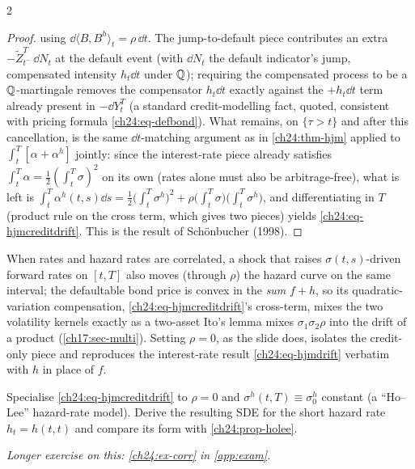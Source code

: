 \begin{paracol}{2}
\begin{proof}
using $\dd\langle B,B^h\rangle_t=\rho\,\dd t$. The jump-to-default piece contributes an extra $-\tilde Z_{t^-}^T\,\dd N_t$ at the default event (with $\dd N_t$ the default indicator's jump, compensated intensity $h_t\dd t$ under $\mathbb{Q}$); requiring the compensated process to be a $\mathbb{Q}$-martingale removes the compensator $h_t\dd t$ exactly against the $+h_t\dd t$ term already present in $-\dd Y_t^T$ (a standard credit-modelling fact, quoted, consistent with pricing formula \eqref{ch24:eq-defbond}). What remains, on $\{\tau>t\}$ and after this cancellation, is the same $\dd t$-matching argument as in \cref{ch24:thm-hjm} applied to $\int_t^T[\alpha+\alpha^h]$ jointly: since the interest-rate piece already satisfies $\int_t^T\alpha=\tfrac12(\int_t^T\sigma)^2$ on its own (rates alone must also be arbitrage-free), what is left is
$\int_t^T\alpha^h(t,s)\dd s=\tfrac12\bigl(\int_t^T\sigma^h\bigr)^2+\rho\bigl(\int_t^T\sigma\bigr)\bigl(\int_t^T\sigma^h\bigr)$, and differentiating in $T$ (product rule on the cross term, which gives two pieces) yields \eqref{ch24:eq-hjmcreditdrift}. This is the result of Sch\"onbucher (1998).
\end{proof}
\begin{intuition}
When rates and hazard rates are correlated, a shock that raises $\sigma(t,s)$-driven forward rates on $[t,T]$ also moves (through $\rho$) the hazard curve on the same interval; the defaultable bond price is convex in the \emph{sum} $f+h$, so its quadratic-variation compensation, \eqref{ch24:eq-hjmcreditdrift}'s cross-term, mixes the two volatility kernels exactly as a two-asset Ito's lemma mixes $\sigma_1\sigma_2\rho$ into the drift of a product (\cref{ch17:sec-multi}). Setting $\rho=0$, as the slide does, isolates the credit-only piece and reproduces the interest-rate result \eqref{ch24:eq-hjmdrift} verbatim with $h$ in place of $f$.
\end{intuition}

\begin{exercise}\label{ch24:ex-credit0}
Specialise \eqref{ch24:eq-hjmcreditdrift} to $\rho=0$ and $\sigma^h(t,T)\equiv\sigma_0^h$ constant (a ``Ho--Lee'' hazard-rate model). Derive the resulting SDE for the short hazard rate $h_t=h(t,t)$ and compare its form with \cref{ch24:prop-holee}.
\end{exercise}

\noindent\emph{Longer exercise on this: \cref{ch24:ex-corr} in \cref{app:exam}.}


\end{paracol}
